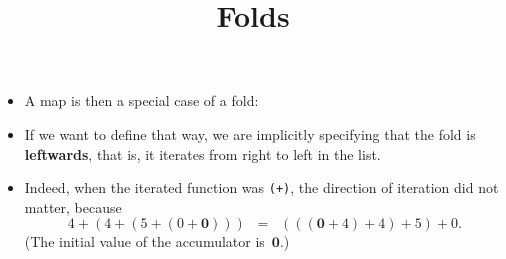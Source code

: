 \documentclass[wide]{slides}
\begin{document}
\begin{slide}
  \title{Folds}

  \begin{itemize}

    \item A map is then a special case of a fold:

      \smallskip
      \noindent{}

      \noindent{}

      \smallskip

      \noindent{}

      \noindent{}

    \item If we want to define  that way, we are implicitly
      specifying that the fold is \textbf{leftwards}, that is, it
      iterates from right to left in the list.

    \item Indeed, when the iterated function was \texttt{(+)}, the
      direction of iteration did not matter, because
      \begin{equation*}
        4 + (4 + (5 + (0 + \textbf{0}))) \;\; = \;\;
        (((\textbf{0} + 4) + 4) + 5) + 0.
      \end{equation*}
      (The initial value of the accumulator is~\(\textbf{0}\).)

  \end{itemize}

\end{slide}
\end{document}
